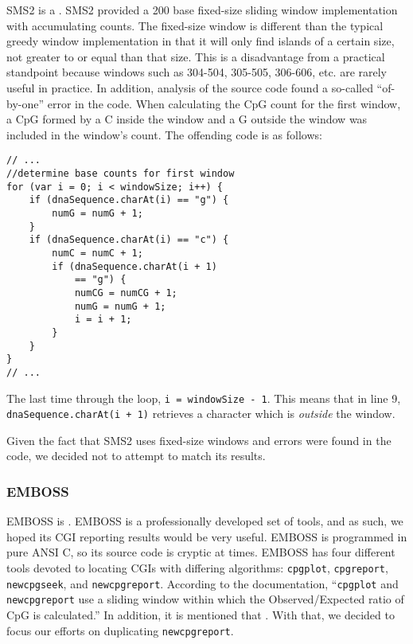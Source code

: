 \documentclass{bioinfo}
\begin{document}
SMS2 is a . SMS2 provided a 200 base fixed-size sliding window
implementation with accumulating counts. The fixed-size window is
different than the typical greedy window implementation in that it
will only find islands of a certain size, not greater to or equal than
that size. This is a disadvantage from a practical standpoint because
windows such as 304-504, 305-505, 306-606, etc. are rarely useful in
practice. In addition, analysis of the source code found a so-called
``of-by-one'' error in the code. When calculating the CpG count for
the first window, a CpG formed by a C inside the window and a G
outside the window was included in the window's count. The offending
code is as follows:
\pagebreak
\begin{verbatim}
// ...
//determine base counts for first window
for (var i = 0; i < windowSize; i++) {
    if (dnaSequence.charAt(i) == "g") {
        numG = numG + 1;
    }
    if (dnaSequence.charAt(i) == "c") {
        numC = numC + 1;
        if (dnaSequence.charAt(i + 1)
            == "g") {
            numCG = numCG + 1;
            numG = numG + 1;
            i = i + 1;
        }
    }
}
// ...
\end{verbatim}

The last time through the loop, \verb|i = windowSize - 1|.
This means that in line 9,
\verb|dnaSequence.charAt(i + 1)|
retrieves a character which is \emph{outside} the window.

Given the fact that SMS2 uses fixed-size windows and errors were found
in the code, we decided not to attempt to match its results.

\subsubsection{EMBOSS}

EMBOSS is . EMBOSS is a professionally developed set of
tools, and as such, we hoped its CGI reporting results would be very
useful. EMBOSS is programmed in pure ANSI C, so its source code is
cryptic at times. EMBOSS has four different tools devoted to locating
CGIs with differing algorithms: \texttt{cpgplot}, \texttt{cpgreport},
\texttt{newcpgseek}, and \texttt{newcpgreport}. According to the
documentation, ``\texttt{cpgplot} and \texttt{newcpgreport} use a
sliding window within which the Observed/Expected ratio of CpG is
calculated.'' In addition, it is mentioned that
. With
that, we decided to focus our efforts on duplicating
\texttt{newcpgreport}.
\end{document}
